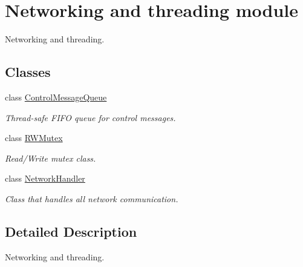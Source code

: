 \hypertarget{group__network__thread}{}\section{Networking and threading module}
\label{group__network__thread}


Networking and threading.  


\subsection*{Classes}
\begin{DoxyCompactItemize}
\item 
class \mbox{\hyperlink{classControlMessageQueue}{Control\+Message\+Queue}}
\begin{DoxyCompactList}\small\item\em Thread-\/safe F\+I\+FO queue for control messages. \end{DoxyCompactList}\item 
class \mbox{\hyperlink{classRWMutex}{R\+W\+Mutex}}
\begin{DoxyCompactList}\small\item\em Read/\+Write mutex class. \end{DoxyCompactList}\item 
class \mbox{\hyperlink{classNetworkHandler}{Network\+Handler}}
\begin{DoxyCompactList}\small\item\em Class that handles all network communication. \end{DoxyCompactList}\end{DoxyCompactItemize}


\subsection{Detailed Description}
Networking and threading. 

